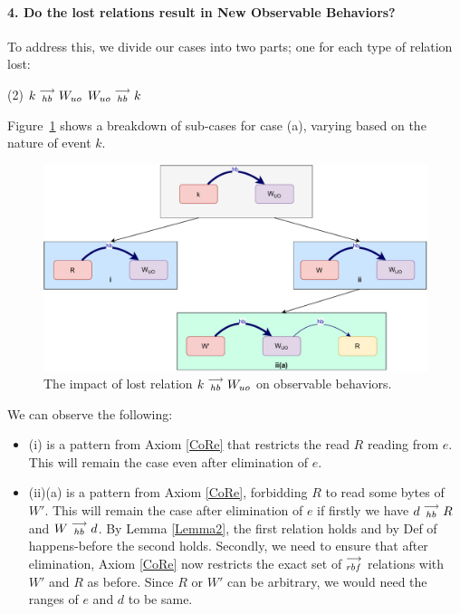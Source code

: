 \paragraph{4. Do the lost relations result in New Observable Behaviors?}

    To address this, we divide our cases into two parts; one for each type of relation lost:
    \begin{tasks}(2)
        \task $k\stackrel{\longrightarrow}{_{hb}}W_{uo}$
        \task $W_{uo}\stackrel{\longrightarrow}{_{hb}}k$
    \end{tasks}

    Figure~\ref{elim_write:case1} shows a breakdown of sub-cases for case (a), varying based
    on the nature of event $k$.
    \begin{figure}[H]
        \centering
        \includegraphics[scale=0.5]{6.Elimination/1.ValidEliminationCandidate/WriteElimProof/ProofParts/Part4Case1.pdf}
        \caption{The impact of lost relation $k\stackrel{\longrightarrow}{_{hb}}W_{uo}$ on observable behaviors.}
        \label{elim_write:case1}
    \end{figure}

    We can observe the following:
    \begin{itemize}
        \item (i) is a pattern from Axiom \ref{CoRe} that restricts the read $R$ reading from $e$. This will remain the case even after elimination of $e$.
        \item (ii)(a) is a pattern from Axiom \ref{CoRe}, forbidding $R$ to read some bytes of $W'$. 
        This will remain the case after elimination of $e$ if firstly we have $d\stackrel{\longrightarrow}{_{hb}}R$ and $W\stackrel{\longrightarrow}{_{hb}}d$.
        By Lemma \ref{Lemma2}, the first relation holds and by Def of happens-before the second holds. 
        Secondly, we need to ensure that after elimination, Axiom \ref{CoRe} now restricts the exact set of $\stackrel{\longrightarrow}{_{rbf}}$ relations with $W'$ and $R$ as before. 
        Since $R$ or $W'$ can be arbitrary, we would need the ranges of $e$ and $d$ to be same.
    \end{itemize}

